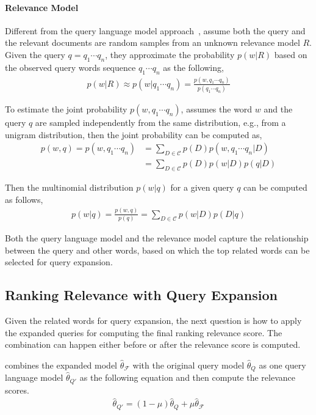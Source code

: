 \paragraph{Relevance Model}

Different from the query language model approach~\citep{zhai-01b}, \cite{Lavrenko-2001} assume both the query and the relevant documents are random samples from an unknown relevance model $R$. Given the query $q = q_1 \cdots q_n$, they approximate the probability $p(w|R)$ based on the observed query words sequence $q_1 \cdots q_n$ as the following,
\begin{align}
p(w|R) \approx p(w|q_1 \cdots q_n) = \frac{p(w,q_1 \cdots q_n)}{p(q_1 \cdots q_n)}
\end{align}

To estimate the joint probability $p(w,q_1 \cdots q_n)$, \cite{Lavrenko-2001} assumes the word $w$ and the query $q$ are sampled independently from the same distribution, e.g., from a unigram distribution, then the joint probability can be computed as,
\begin{align}
p(w, q) = p(w,q_1 \cdots q_n) &= \sum_{D \in \mathcal{C}} p(D) p(w,q_1 \cdots q_n | D) \\
&= \sum_{D \in \mathcal{C}} p(D) p(w|D) p(q | D)
\end{align}

Then the multinomial distribution $p(w|q)$ for a given query $q$ can be computed as follows,
\begin{align}
\label{eq:rm_qe}
p(w|q) = \frac{p(w, q)}{p(q)} = \sum_{D \in \mathcal{C}} p(w|D) p(D|q)
\end{align}

Both the query language model and the relevance model capture the relationship between the query and other words, based on which the top related words can be selected for query expansion.

\subsection{Ranking Relevance with Query Expansion}

Given the related words for query expansion, the next question is how to apply the expanded queries for computing the final ranking relevance score. The combination can happen either before or after the relevance score is computed.

\cite{zhai-01b} combines the expanded model $\hat{\theta}_{\mathcal{F}}$ with the original query model $\hat{\theta}_{Q}$ as one query language model $\hat{\theta}_{Q'} $ as the following equation and then compute the relevance scores.
\begin{align}
\hat{\theta}_{Q'} = (1 - \mu)\hat{\theta}_{Q} + \mu \hat{\theta}_{\mathcal{F}}
\end{align}

